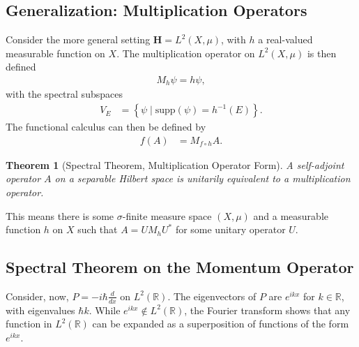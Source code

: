 \documentclass[12pt]{extarticle}
\newcommand{\R}{\mathbb{R}}
\newcommand{\set}[1]{\left\{#1\right\}}
\theoremstyle{plain}
\newtheorem*{theorem}{Theorem}%
\theoremstyle{definition}
\theoremstyle{remark}
\renewcommand{\newline}{\hfill\break}
\begin{document}
  \subsection{Generalization: Multiplication Operators}%
  Consider the more general setting $\mathbf{H} = L^{2}(X,\mu)$, with $h$ a real-valued measurable function on $X$. The multiplication operator on $L^{2}(X,\mu)$ is then defined
  \begin{align*}
    M_h\psi = h\psi,
  \end{align*}
  with the spectral subspaces
  \begin{align*}
    V_E &= \set{\psi\mid \text{supp}(\psi) = h^{-1}(E)}.
  \end{align*}
  The functional calculus can then be defined by
  \begin{align*}
    f(A) &= M_{f\circ h}A.
  \end{align*}
  \begin{theorem}[Spectral Theorem, Multiplication Operator Form]
    A self-adjoint operator $A$ on a separable Hilbert space is unitarily equivalent to a multiplication operator.
  \end{theorem}
  This means there is some $\sigma$-finite measure space $(X,\mu)$ and a measurable function $h$ on $X$ such that $A = UM_hU^{\ast}$ for some unitary operator $U$.
  \subsection{Spectral Theorem on the Momentum Operator}%
  Consider, now, $P = -i\hbar \frac{d }{dx}$ on $L^{2}(\R)$. The eigenvectors of $P$ are $e^{ikx}$ for $k\in \R$, with eigenvalues $\hbar k$. While $e^{ikx}\notin L^{2}(\R)$, the Fourier transform shows that any function in $L^{2}(\R)$ can be expanded as a superposition of functions of the form $e^{ikx}$.\newline
\end{document}
